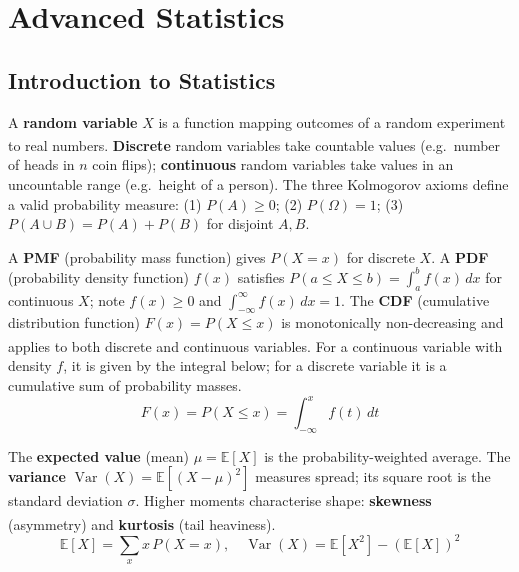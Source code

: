     \section{Advanced Statistics}
    \subsection{Introduction to Statistics}
    \begin{tcbitemize}[ skin=sectionraster ]

        \tcbitem[title={Random Variables}, raster multicolumn=6]
        A \textbf{random variable} $X$ is a function mapping outcomes of a random experiment to real numbers\textsuperscript{\cite{downeyThinkStatsExploratory2015}}. \textbf{Discrete} random variables take countable values (e.g.\ number of heads in $n$ coin flips); \textbf{continuous} random variables take values in an uncountable range (e.g.\ height of a person). The three Kolmogorov axioms define a valid probability measure: (1) $P(A) \geq 0$; (2) $P(\Omega) = 1$; (3) $P(A \cup B) = P(A) + P(B)$ for disjoint $A, B$.

        \tcbitem[title={Probability Distributions}, raster multicolumn=6]
        A \textbf{PMF} (probability mass function) gives $P(X = x)$ for discrete $X$. A \textbf{PDF} (probability density function) $f(x)$ satisfies $P(a \leq X \leq b) = \int_a^b f(x)\,dx$ for continuous $X$; note $f(x) \geq 0$ and $\int_{-\infty}^{\infty} f(x)\,dx = 1$. The \textbf{CDF} (cumulative distribution function) $F(x) = P(X \leq x)$ is monotonically non-decreasing and applies to both discrete and continuous variables\textsuperscript{\cite{brucePracticalStatisticsData2017}}. For a continuous variable with density $f$, it is given by the integral below; for a discrete variable it is a cumulative sum of probability masses.
        \tcblower
        \begin{equation}
            F(x) = P(X \leq x) = \int_{-\infty}^{x} f(t)\,dt
        \end{equation}

        \tcbitem[title={Expectation Values and Moments}, raster multicolumn=6]
        The \textbf{expected value} (mean) $\mu = \mathbb{E}[X]$ is the probability-weighted average. The \textbf{variance} $\operatorname{Var}(X) = \mathbb{E}[(X-\mu)^2]$ measures spread; its square root is the standard deviation $\sigma$. Higher moments characterise shape: \textbf{skewness} (asymmetry) and \textbf{kurtosis} (tail heaviness)\textsuperscript{\cite{downeyThinkStatsExploratory2015}}.
        \tcblower
        \begin{equation}
            \mathbb{E}[X] = \sum_x x\,P(X=x), \quad
            \operatorname{Var}(X) = \mathbb{E}[X^2] - (\mathbb{E}[X])^2
        \end{equation}


\end{tcbitemize}
